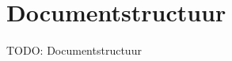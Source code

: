 \documentclass[../presentatie.tex]{subfiles}
\begin{document}
    \section{Documentstructuur}

    \begin{frame}
        TODO: Documentstructuur
    \end{frame}
\end{document}
